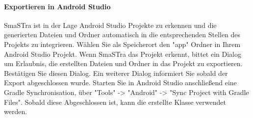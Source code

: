 \paragraph{Exportieren in Android Studio}
SmaSTra ist in der Lage Android Studio Projekte zu erkennen und die generierten Dateien und Ordner automatisch in die entsprechenden Stellen des Projekts zu integrieren.
W\"ahlen Sie als Speicherort den "app" Ordner in Ihrem Android Studio Projekt. Wenn SmaSTra das Projekt erkennt, bittet ein Dialog um Erlaubnis, die erstellten Dateien und Ordner in das Projekt zu exportieren. Best\"atigen Sie diesen Dialog. Ein weiterer Dialog informiert Sie sobald der Export abgeschlossen wurde. Starten Sie in Android Studio anschlie{\ss}end eine Gradle Synchronisation, \"uber "Tools" -> "Android" -> "Sync Project with Gradle Files". Sobald diese Abgeschlossen ist, kann die erstellte Klasse verwendet werden.

